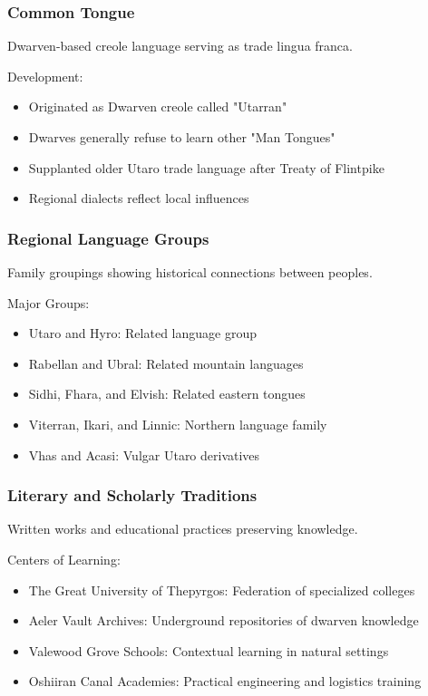 \subsubsection{Common Tongue}
\label{sec:common}

Dwarven-based creole language serving as trade lingua franca.

Development:
\begin{itemize}
    \item Originated as Dwarven creole called "Utarran"
    \item Dwarves generally refuse to learn other "Man Tongues"
    \item Supplanted older Utaro trade language after Treaty of Flintpike
    \item Regional dialects reflect local influences
\end{itemize}

\subsubsection{Regional Language Groups}
\label{sec:languagerelations}

Family groupings showing historical connections between peoples.

Major Groups:
\begin{itemize}
    \item Utaro and Hyro: Related language group
    \item Rabellan and Ubral: Related mountain languages
    \item Sidhi, Fhara, and Elvish: Related eastern tongues
    \item Viterran, Ikari, and Linnic: Northern language family
    \item Vhas and Acasi: Vulgar Utaro derivatives
\end{itemize}

\subsubsection{Literary and Scholarly Traditions}
\label{sec:scholarship}

Written works and educational practices preserving knowledge.

Centers of Learning:
\begin{itemize}
    \item The Great University of Thepyrgos: Federation of specialized colleges
    \item Aeler Vault Archives: Underground repositories of dwarven knowledge
    \item Valewood Grove Schools: Contextual learning in natural settings
    \item Oshiiran Canal Academies: Practical engineering and logistics training
\end{itemize}

